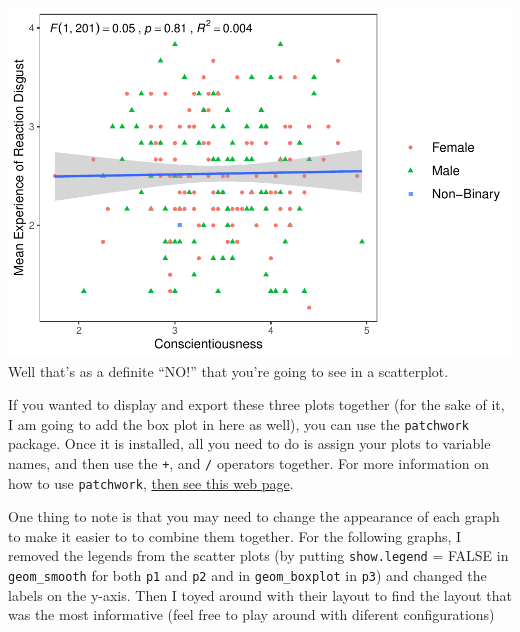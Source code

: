 \documentclass[
]{book}
\begin{document}
\includegraphics{rintro_demo_files/figure-latex/unnamed-chunk-319-1.pdf}
Well that's as a definite ``NO!'' that you're going to see in a scatterplot.

If you wanted to display and export these three plots together (for the sake of it, I am going to add the box plot in here as well), you can use the \texttt{patchwork} package. Once it is installed, all you need to do is assign your plots to variable names, and then use the \texttt{+}, \texttt{\textbar{}} and \texttt{/} operators together. For more information on how to use \texttt{patchwork}, \href{https://gotellilab.github.io/GotelliLabMeetingHacks/NickGotelli/ggplotPatchwork.html}{then see this web page}.

One thing to note is that you may need to change the appearance of each graph to make it easier to to combine them together. For the following graphs, I removed the legends from the scatter plots (by putting \texttt{show.legend} = FALSE in \texttt{geom\_smooth} for both \texttt{p1} and \texttt{p2} and in \texttt{geom\_boxplot} in \texttt{p3}) and changed the labels on the y-axis. Then I toyed around with their layout to find the layout that was the most informative (feel free to play around with diferent configurations)
\end{document}
